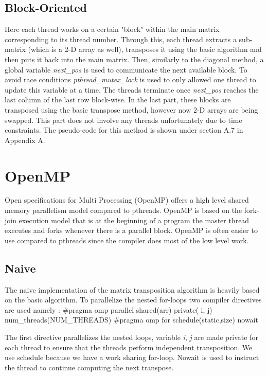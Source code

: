 \documentclass[10pt,journal]{article}
\begin{document}
\newline 

\subsection{Block-Oriented}
Here each thread works on a certain "block" within the main matrix corresponding to its thread number. Through this, each thread extracts a sub-matrix (which is a 2-D array as well), transposes it using the basic algorithm and then puts it back into the main matrix. Then, similarly to the diagonal method, a global variable \textit {next\_pos} is used to communicate the next available block. To avoid race conditions \textit {pthread\_mutex\_lock} is used to only allowed one thread to update this variable at a time. The threads terminate once \textit {next\_pos} reaches the last column of the last row block-wise. In the last part, these blocks are transposed using the basic transpose method, however now 2-D arrays are being swapped. This part does not involve any threads unfortunately due to time constraints. The pseudo-code for this method is shown under section A.7 in Appendix A. 

\section{OpenMP}

Open specifications for Multi Processing (OpenMP) offers a high level shared memory parallelism model compared to pthreads. OpenMP is based on the fork-join execution model that is at the beginning of a program the master thread executes and forks whenever there is a parallel block. OpenMP is often easier to use compared to pthreads since the compiler does most of the low level work.

\subsection{Naive}
The naive implementation of the matrix transposition algorithm is heavily based on the basic algorithm. To parallelize the nested for-loops two compiler directives are used namely :
\newline
{\#pragma omp parallel shared(arr) private( i, j) num_threads(NUM\_THREADS) } 
\newline
{\#pragma omp for schedule(static,size)  nowait}
\newline

The first directive parallelizes the nested loops, variable \textit{i}, \textit{j} are made private for each thread to ensure that the threads perform independent transposition. We use schedule because we have a work sharing for-loop. Nowait is used to instruct the thread to continue computing the next transpose.
\end{document}
